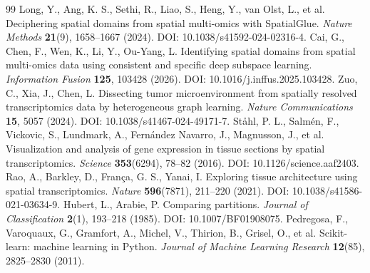 \documentclass[twocolumn,10pt]{article}
\begin{document}
\begin{thebibliography}{99}
 Long, Y., Ang, K. S., Sethi, R., Liao, S., Heng, Y., van Olst, L., et al. Deciphering spatial domains from spatial multi-omics with SpatialGlue. \emph{Nature Methods} \textbf{21}(9), 1658--1667 (2024). DOI: 10.1038/s41592-024-02316-4.
 Cai, G., Chen, F., Wen, K., Li, Y., Ou-Yang, L. Identifying spatial domains from spatial multi-omics data using consistent and specific deep subspace learning. \emph{Information Fusion} \textbf{125}, 103428 (2026). DOI: 10.1016/j.inffus.2025.103428.
 Zuo, C., Xia, J., Chen, L. Dissecting tumor microenvironment from spatially resolved transcriptomics data by heterogeneous graph learning. \emph{Nature Communications} \textbf{15}, 5057 (2024). DOI: 10.1038/s41467-024-49171-7.
 St{\aa}hl, P. L., Salm{\'e}n, F., Vickovic, S., Lundmark, A., Fern{\'a}ndez Navarro, J., Magnusson, J., et al. Visualization and analysis of gene expression in tissue sections by spatial transcriptomics. \emph{Science} \textbf{353}(6294), 78--82 (2016). DOI: 10.1126/science.aaf2403.
 Rao, A., Barkley, D., Fran{\c c}a, G. S., Yanai, I. Exploring tissue architecture using spatial transcriptomics. \emph{Nature} \textbf{596}(7871), 211--220 (2021). DOI: 10.1038/s41586-021-03634-9.
 Hubert, L., Arabie, P. Comparing partitions. \emph{Journal of Classification} \textbf{2}(1), 193--218 (1985). DOI: 10.1007/BF01908075.
 Pedregosa, F., Varoquaux, G., Gramfort, A., Michel, V., Thirion, B., Grisel, O., et al. Scikit-learn: machine learning in Python. \emph{Journal of Machine Learning Research} \textbf{12}(85), 2825--2830 (2011).
\end{thebibliography}
\end{document}
